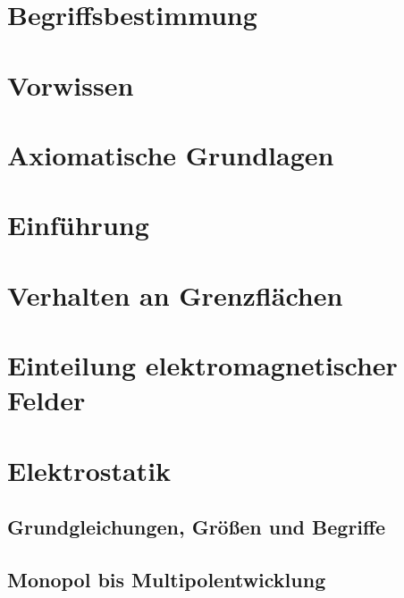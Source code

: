 
\usepackage{pdfpages}
\usepackage{fancyhdr}
\usepackage{xcolor}



\fancyfootoffset{-1.26cm}
 
\section{Begriffsbestimmung}

\section{Vorwissen}

\section{Axiomatische Grundlagen}

\section{Einführung}

\section{Verhalten an Grenzflächen}

\section{Einteilung elektromagnetischer Felder}

\section{Elektrostatik}
\subsection{Grundgleichungen, Größen und Begriffe}

\subsection{Monopol bis Multipolentwicklung}

